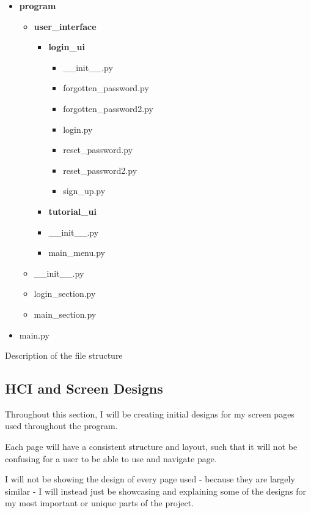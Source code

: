 \documentclass{article}
\begin{document}
\begin{itemize}
    \item \textbf{program}
    \begin{itemize}
        \item \textbf{user\_interface}
        \begin{itemize}
            \item \textbf{login\_ui}
            \begin{itemize}
                \item \_\_init\_\_.py
                \item forgotten\_password.py
                \item forgotten\_password2.py
                \item login.py
                \item reset\_password.py
                \item reset\_password2.py
                \item sign\_up.py
            \end{itemize}
            \item \textbf{tutorial\_ui}
            \item \_\_init\_\_.py
            \item main\_menu.py
        \end{itemize}
        \item \_\_init\_\_.py
        \item login\_section.py
        \item main\_section.py
    \end{itemize}
    \item main.py
\end{itemize}

Description of the file structure

\clearpage

\subsection{HCI and Screen Designs}
Throughout this section, I will be creating initial designs for my screen pages used throughout the program.

Each page will have a consistent structure and layout, such that it will not be confusing for a user to be able to use and navigate page.

I will not be showing the design of every page used - because they are largely similar - I will instead just be showcasing and explaining some of the designs for my most important or unique parts of the project.
\end{document}
